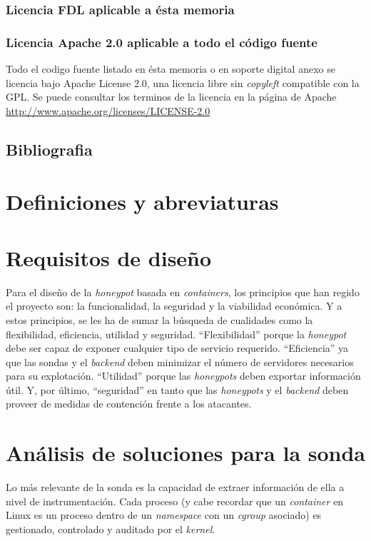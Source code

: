 \subsubsection{Licencia FDL aplicable a ésta memoria}

\subsubsection{Licencia Apache 2.0 aplicable a todo el código fuente}
Todo el codigo fuente listado en ésta memoria o en soporte digital anexo se licencia bajo Apache License 2.0, una licencia libre sin \emph{copyleft} compatible con la GPL.
Se puede consultar los terminos de la licencia en la página de Apache \url{http://www.apache.org/licenses/LICENSE-2.0}

\subsection{Bibliografia}
\printbibliography[title={Referencias},heading=none]
\nopagebreak
\section{Definiciones y abreviaturas}
\section{Requisitos de diseño}

Para el diseño de la \emph{honeypot} basada en \emph{containers}, los principios que han regido el proyecto son: la funcionalidad, la seguridad y la viabilidad económica. Y a estos principios, se les ha de sumar la búsqueda de cualidades como la flexibilidad, eficiencia, utilidad y seguridad. ``Flexibilidad'' porque la \emph{honeypot} debe ser capaz de exponer cualquier tipo de servicio requerido. ``Eficiencia'' ya que las sondas y el \emph{backend} deben minimizar el número de servidores necesarios para su explotación. ``Utilidad'' porque las \emph{honeypots} deben exportar información útil. Y, por último, ``seguridad''  en tanto que las \emph{honeypots} y el \emph{backend} deben proveer de medidas de contención frente a los atacantes.




\section{Análisis de soluciones para la sonda}
\label{sec:analisis-sonda}


Lo más relevante de la sonda es la capacidad de extraer información de ella a nivel de instrumentación. Cada proceso (y cabe recordar que un \emph{container} en Linux es un proceso dentro de un \emph{namespace} con un \emph{cgroup} asociado) es gestionado, controlado
y auditado por el \emph{kernel}.

